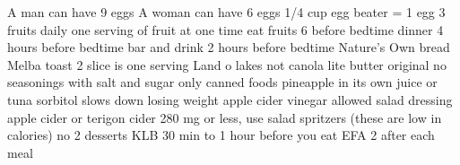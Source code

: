 \documentclass{article}
\begin{document}
A man can have 9 eggs
A woman can have 6 eggs
1/4 cup egg beater = 1 egg
3 fruits daily
one serving of fruit at one time
eat fruits 6 before bedtime
dinner 4 hours before bedtime
bar and drink 2 hours before bedtime
Nature's Own bread
Melba toast 2 slice is one serving
Land o lakes not canola lite butter original
no seasonings with salt and sugar
only canned foods pineapple in its own juice or tuna
sorbitol slows down losing weight
apple cider vinegar allowed
salad dressing apple cider or terigon cider 280 mg or less, use salad spritzers (these are low in calories)
no 2 desserts
KLB 30 min to 1 hour before you eat
EFA 2 after each meal
\end{document}
